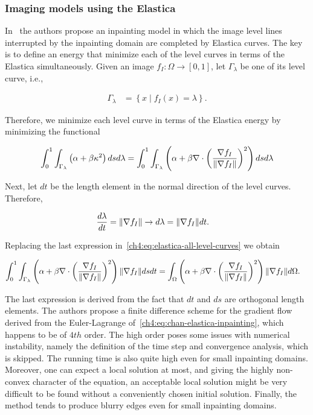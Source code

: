\subsubsection{Imaging models using the Elastica}

In~\cite{chan02elasticainpainting} the authors propose an inpainting model in which the image level lines interrupted by the inpainting domain are completed by Elastica curves. The key is to define an energy that minimize each of the level curves in terms of the Elastica simultaneously. Given an image $f_I:\Omega \rightarrow [0,1]$, let $\Gamma_{\lambda}$ be one of its level curve, i.e.,

\begin{align*}
	\Gamma_{\lambda} &= \left\{ x \; | \; f_I(x)=\lambda \right\}.
\end{align*}

Therefore, we minimize each level curve in terms of the Elastica energy by minimizing the functional

\begin{align}
	\int_{0}^{1}{ \int_{\Gamma_{\lambda}}{ \left( \alpha + \beta \kappa ^2 \right) dsd\lambda}} = \int_{0}^{1}{ \int_{\Gamma_{\lambda}}{ \left(\alpha + \beta \nabla \cdot \left(\frac{\nabla f_I}{\lVert\nabla f_I\rVert}\right) ^2 \right) dsd\lambda}}
	\label{ch4:eq:elastica-all-level-curves}
\end{align}

Next, let $dt$ be the length element in the normal direction of the level curves. Therefore,

\begin{align*}
	\frac{d \lambda}{d t} &= \lVert\nabla f_I\rVert \rightarrow d\lambda = \lVert\nabla f_I\rVert dt.
\end{align*}

Replacing the last expression in~\cref{ch4:eq:elastica-all-level-curves} we obtain

\begin{align}
	\int_{0}^{1}{ \int_{\Gamma_{\lambda}}{ \left(\alpha + \beta \nabla \cdot \left(\frac{\nabla f_I}{\lVert\nabla f_I\rVert}\right) ^2 \right)\lVert\nabla f_I\rVert dsdt}} &= \int_{\Omega}{ \left(\alpha + \beta \nabla \cdot \left(\frac{\nabla f_I}{\lVert\nabla f_I\rVert}\right) ^2 \right)\lVert\nabla f_I\rVert d\Omega}.
	\label{ch4:eq:chan-elastica-inpainting}
\end{align}

The last expression is derived from the fact that $dt$ and $ds$ are orthogonal length elements. The authors propose a finite difference scheme for the gradient flow derived from the Euler-Lagrange of~\cref{ch4:eq:chan-elastica-inpainting}, which happens to be of $4th$ order. The high order poses some issues with numerical instability, namely the definition of the time step and convergence analysis, which is skipped. The running time is also quite high even for small inpainting domains. Moreover, one can expect a local solution at most, and giving the highly non-convex character of the equation, an acceptable local solution might be very difficult to be found without a conveniently chosen initial solution. Finally, the  method tends to produce blurry edges even for small inpainting domains. 

